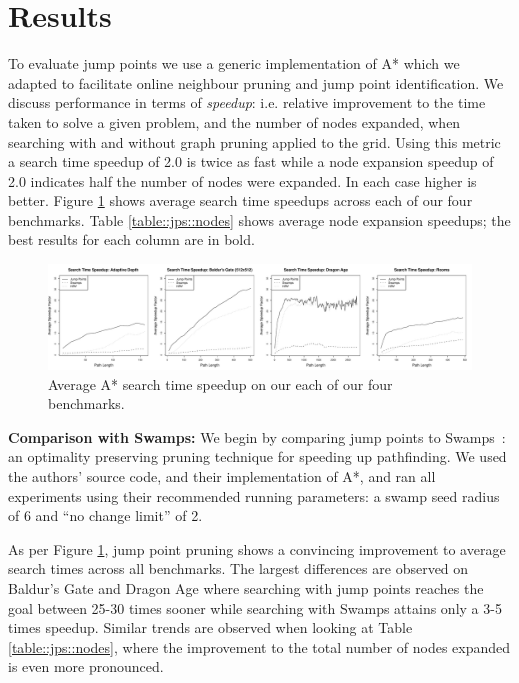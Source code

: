 \section{Results}
\label{cha::jps::results}

To evaluate jump points we use a generic implementation of A* which we 
adapted to facilitate online neighbour pruning and jump point identification.
We discuss
performance in terms of \emph{speedup}: i.e. relative improvement to the time 
taken to solve a given problem, and the number of nodes expanded, when searching
with and without graph pruning applied to the grid.
Using this metric a search time speedup
of 2.0 is twice as fast while a node expansion speedup of 2.0 indicates half the
number of nodes were expanded.  In each case higher is better.
Figure \ref{fig::jps::speedup} shows average search time speedups across
each of our four benchmarks. Table \ref{table::jps::nodes} shows average
node expansion speedups; the best results for each column are in bold.



\begin{figure}[t]
   \begin{center}
	   \includegraphics[width=0.95\columnwidth, trim = 10mm 10mm 10mm 0mm]
		{chapter_jps/diagrams/speedup.pdf}
   \end{center}
   \caption{Average A* search time speedup on our each of our four benchmarks. }

\label{fig::jps::speedup}
\end{figure}

\textbf{Comparison with Swamps: }
We begin by comparing jump points to Swamps~\cite{pochter10}: an optimality
preserving pruning technique for speeding up pathfinding.  
We used the authors' source code, and their implementation of A*, and ran
all experiments using their recommended running parameters: a swamp seed radius
of 6 and ``no change limit'' of 2.

As per Figure \ref{fig::jps::speedup}, jump point pruning shows a convincing
improvement to average search times across all benchmarks.
The largest differences are
observed on Baldur's Gate and Dragon Age where searching with jump points
reaches the goal between 25-30 times sooner while searching with Swamps attains only a 3-5
times speedup.  Similar trends are observed when looking at Table
\ref{table::jps::nodes}, where the improvement to the total number of nodes expanded
is even more pronounced.

